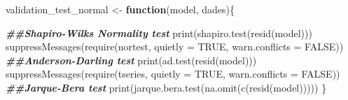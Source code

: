\documentclass[
]{article}
\newenvironment{Shaded}{\begin{snugshade}}{\end{snugshade}}
\newcommand{\AttributeTok}[1]{\textcolor[rgb]{0.77,0.63,0.00}{#1}}
\newcommand{\ConstantTok}[1]{\textcolor[rgb]{0.00,0.00,0.00}{#1}}
\newcommand{\ControlFlowTok}[1]{\textcolor[rgb]{0.13,0.29,0.53}{\textbf{#1}}}
\newcommand{\DecValTok}[1]{\textcolor[rgb]{0.00,0.00,0.81}{#1}}
\newcommand{\DocumentationTok}[1]{\textcolor[rgb]{0.56,0.35,0.01}{\textbf{\textit{#1}}}}
\newcommand{\FunctionTok}[1]{\textcolor[rgb]{0.00,0.00,0.00}{#1}}
\newcommand{\NormalTok}[1]{#1}
\newcommand{\OtherTok}[1]{\textcolor[rgb]{0.56,0.35,0.01}{#1}}
\newcommand{\SpecialCharTok}[1]{\textcolor[rgb]{0.00,0.00,0.00}{#1}}
\begin{document}
\begin{Shaded}
\end{Shaded}

\begin{Shaded}
\begin{Highlighting}[]
\NormalTok{validation\_test\_normal }\OtherTok{\textless{}{-}} \ControlFlowTok{function}\NormalTok{(model, dades)\{}
  
\DocumentationTok{\#\#Shapiro{-}Wilks Normality test}
\FunctionTok{print}\NormalTok{(}\FunctionTok{shapiro.test}\NormalTok{(}\FunctionTok{resid}\NormalTok{(model)))}
\FunctionTok{suppressMessages}\NormalTok{(}\FunctionTok{require}\NormalTok{(nortest, }\AttributeTok{quietly =} \ConstantTok{TRUE}\NormalTok{, }\AttributeTok{warn.conflicts =} \ConstantTok{FALSE}\NormalTok{))}
\DocumentationTok{\#\#Anderson{-}Darling test}
\FunctionTok{print}\NormalTok{(}\FunctionTok{ad.test}\NormalTok{(}\FunctionTok{resid}\NormalTok{(model)))}
\FunctionTok{suppressMessages}\NormalTok{(}\FunctionTok{require}\NormalTok{(tseries, }\AttributeTok{quietly =} \ConstantTok{TRUE}\NormalTok{, }\AttributeTok{warn.conflicts =} \ConstantTok{FALSE}\NormalTok{))}
\DocumentationTok{\#\#Jarque{-}Bera test}
\FunctionTok{print}\NormalTok{(}\FunctionTok{jarque.bera.test}\NormalTok{(}\FunctionTok{na.omit}\NormalTok{(}\FunctionTok{c}\NormalTok{(}\FunctionTok{resid}\NormalTok{(model)))))}
\NormalTok{\}}
\end{Highlighting}
\end{Shaded}
\end{document}
